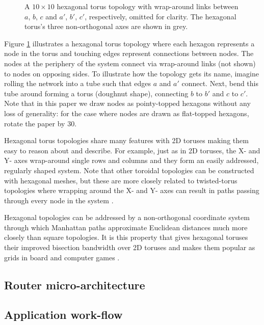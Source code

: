 			\begin{figure}
				\center
				
				\caption{A $10 \times 10$ hexagonal torus topology with wrap-around
				links between $a$, $b$, $c$ and $a'$, $b'$, $c'$, respectively, omitted
				for clarity. The hexagonal torus's three non-orthogonal axes are shown
				in grey.}
				\label{fig:hexagonalTorusTopology}
			\end{figure}
			
			Figure \ref{fig:hexagonalTorusTopology} illustrates a hexagonal torus
			topology where each hexagon represents a node in the torus and touching
			edges represent connections between nodes. The nodes at the periphery of
			the system connect via wrap-around links (not shown) to nodes on opposing
			sides. To illustrate how the topology gets its name, imagine rolling the
			network into a tube such that edges $a$ and $a'$ connect. Next, bend this
			tube around forming a torus (doughnut shape), connecting $b$ to $b'$ and
			$c$ to $c'$. Note that in this paper we draw nodes as pointy-topped
			hexagons without any loss of generality: for the case where nodes are
			drawn as flat-topped hexagons, rotate the paper by 30\degree{}.
			
			Hexagonal torus topologies share many features with 2D toruses making them
			easy to reason about and describe. For example, just as in 2D toruses, the
			X- and Y- axes wrap-around single rows and columns and they form an easily
			addressed, regularly shaped system. Note that other toroidal topologies
			can be constructed with hexagonal meshes, but these are more closely
			related to twisted-torus topologies where wrapping around the X- and Y-
			axes can result in paths passing through every node in the system
			\cite{camara10}.
			
			Hexagonal topologies can be addressed by a non-orthogonal coordinate
			system through which Manhattan paths approximate Euclidean distances much
			more closely than square topologies. It is this property that gives
			hexagonal toruses their improved bisection bandwidth over 2D toruses and
			makes them popular as grids in board and computer games \cite{patel15}.
		
		\subsection{Router micro-architecture}
		\subsection{Application work-flow}
